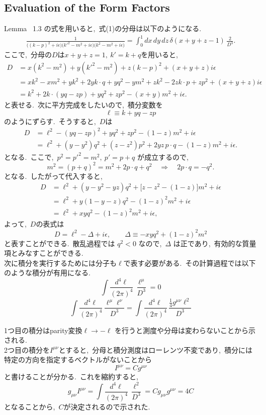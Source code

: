 \documentclass[uplatex,dvipdfmx,a4paper,11pt]{jsarticle}
\begin{document}
\subsection{Evaluation of the Form Factors}
Lemma ~1.3 の式を用いると,~式(1)の分母は以下のようになる.
\[
\begin{aligned}
\frac{1}{
\bigl((k-p)^2+i\epsilon\bigr)
\bigl(k'^2-m^2+i\epsilon\bigr)
\bigl(k^2-m^2+i\epsilon\bigr)}
=
\int_0^1 dx\,dy\,dz\,
\delta(x+y+z-1)\,\frac{2}{D^3}.
\end{aligned}
\]
ここで,~分母の$D$は$x+y+z=1,~k'=k+q$を用いると,
\[
\begin{aligned}
D
&=x(k^2-m^2)+y(k'^2-m^2)+z(k-p)^2
  +(x+y+z)i\epsilon
\\
&=xk^2-xm^2+yk^2+2yk\cdot q+yq^2-ym^2+zk^2-2zk\cdot p+zp^2
  +(x+y+z)i\epsilon
\\
&=k^2+2k\cdot(yq-zp)+yq^2+zp^2
  -(x+y)m^2+i\epsilon.
\end{aligned}
\]
と表せる.~次に平方完成をしたいので,~積分変数を
\[
\ell\equiv k+yq-zp
\]
のようにずらす.~そうすると,~$D$は
\[
\begin{aligned}
D
&=\ell^2-(yq-zp)^2+yq^2+zp^2-(1-z)m^2+i\epsilon\\
&=\ell^2+(y-y^2)q^2+(z-z^2)p^2
+2yz\,p\cdot q-(1-z)m^2+i\epsilon.
\end{aligned}
\]
となる.~ここで,~$p^2=p'^2=m^2,~p'=p+q$ が成立するので,
\[
m^2=(p+q)^2=m^2+2p\cdot q+q^2
\quad\Longrightarrow\quad
2p\cdot q=-q^2.
\]
となる.~したがって代入すると,
\[
\begin{aligned}
D
&=\ell^2+(y-y^2-yz)q^2
+\bigl[z-z^2-(1-z)\bigr]m^2+i\epsilon\\
&=\ell^2+y(1-y-z)q^2-(1-z)^2m^2+i\epsilon\\
&=\ell^2+xyq^2-(1-z)^2m^2+i\epsilon,
\end{aligned}
\]
よって,~$D$の表式は
\[
D=\ell^2-\Delta+i\epsilon,
\qquad
\Delta\equiv-xyq^2+(1-z)^2m^2
\]
と表すことができる.~散乱過程では \(q^2<0\) なので,~\(\Delta\) は正であり,~有効的な質量項とみなすことができる.\\
次に積分を実行するためには分子も$\ell$で表す必要がある.~その計算過程では以下のような積分が有用になる.
\[
\int\frac{d^4\ell}{(2\pi)^4}\,
\frac{\ell^\mu}{D^3}=0
\]
\[
\int\frac{d^4\ell}{(2\pi)^4}\,
\frac{\ell^\mu\ell^\nu}{D^3}
=
\int\frac{d^4\ell}{(2\pi)^4}\,
\frac{\tfrac14 g^{\mu\nu}\ell^2}{D^3}
\]
\begin{myproof}
  1つ目の積分はparity変換\(\ell\to-\ell\) を行うと測度や分母は変わらないことから示される.\\
  2つ目の積分を$I^{\mu\nu}$とすると,~分母と積分測度はローレンツ不変であり,~積分には特定の方向を指定するベクトルがないことから
  \[
  I^{\mu\nu} = Cg^{\mu\nu}
  \]
  と書けることが分かる.~これを縮約すると,
  \[
  g_{\mu\nu}I^{\mu\nu} =\int\frac{d^4\ell}{(2\pi)^4}\,
\frac{\ell^2}{D^3}= Cg_{\mu\nu}g^{\mu\nu}=4C
  \]
  となることから,~$C$が決定されるので示された.
\end{myproof}
\end{document}

